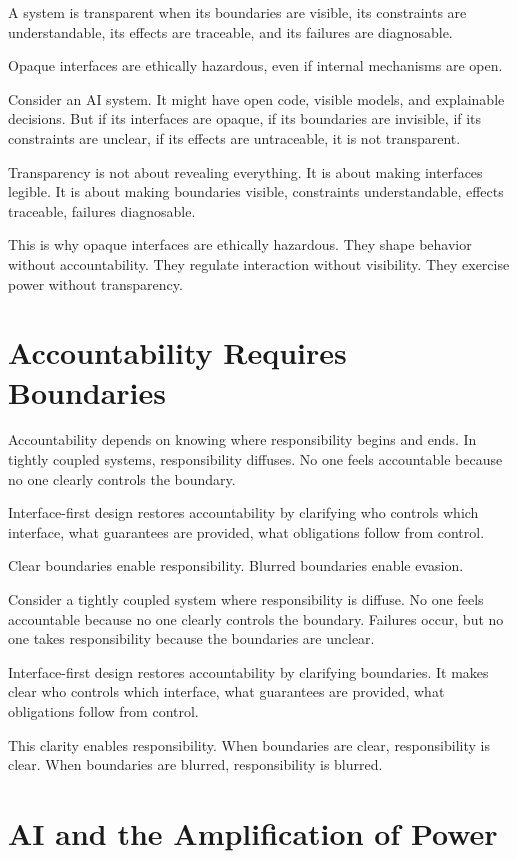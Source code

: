 \documentclass[
  openright]{book}
\begin{document}
A system is transparent when its boundaries are visible, its constraints
are understandable, its effects are traceable, and its failures are
diagnosable.

Opaque interfaces are ethically hazardous, even if internal mechanisms
are open.

Consider an AI system. It might have open code, visible models, and
explainable decisions. But if its interfaces are opaque, if its
boundaries are invisible, if its constraints are unclear, if its effects
are untraceable, it is not transparent.

Transparency is not about revealing everything. It is about making
interfaces legible. It is about making boundaries visible, constraints
understandable, effects traceable, failures diagnosable.

This is why opaque interfaces are ethically hazardous. They shape
behavior without accountability. They regulate interaction without
visibility. They exercise power without transparency.

\section{Accountability Requires
Boundaries}\label{accountability-requires-boundaries}

Accountability depends on knowing where responsibility begins and ends.
In tightly coupled systems, responsibility diffuses. No one feels
accountable because no one clearly controls the boundary.

Interface-first design restores accountability by clarifying who
controls which interface, what guarantees are provided, what obligations
follow from control.

Clear boundaries enable responsibility. Blurred boundaries enable
evasion.

Consider a tightly coupled system where responsibility is diffuse. No
one feels accountable because no one clearly controls the boundary.
Failures occur, but no one takes responsibility because the boundaries
are unclear.

Interface-first design restores accountability by clarifying boundaries.
It makes clear who controls which interface, what guarantees are
provided, what obligations follow from control.

This clarity enables responsibility. When boundaries are clear,
responsibility is clear. When boundaries are blurred, responsibility is
blurred.

\section{AI and the Amplification of
Power}\label{ai-and-the-amplification-of-power}
\end{document}
